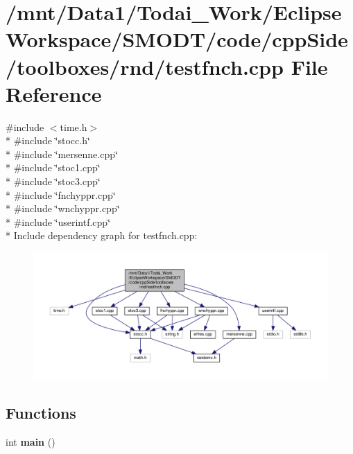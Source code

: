 \section{/mnt/\-Data1/\-Todai\-\_\-\-Work/\-Eclipse\-Workspace/\-S\-M\-O\-D\-T/code/cpp\-Side/toolboxes/rnd/testfnch.cpp File Reference}
\label{toolboxes_2rnd_2testfnch_8cpp}
{\ttfamily \#include $<$time.\-h$>$}\\*
{\ttfamily \#include \char`\"{}stocc.\-h\char`\"{}}\\*
{\ttfamily \#include \char`\"{}mersenne.\-cpp\char`\"{}}\\*
{\ttfamily \#include \char`\"{}stoc1.\-cpp\char`\"{}}\\*
{\ttfamily \#include \char`\"{}stoc3.\-cpp\char`\"{}}\\*
{\ttfamily \#include \char`\"{}fnchyppr.\-cpp\char`\"{}}\\*
{\ttfamily \#include \char`\"{}wnchyppr.\-cpp\char`\"{}}\\*
{\ttfamily \#include \char`\"{}userintf.\-cpp\char`\"{}}\\*
Include dependency graph for testfnch.\-cpp\-:
\nopagebreak
\begin{figure}[H]
\begin{center}
\leavevmode
\includegraphics[width=350pt]{toolboxes_2rnd_2testfnch_8cpp__incl}
\end{center}
\end{figure}
\subsection*{Functions}
\begin{DoxyCompactItemize}
\item 
int {\bf main} ()
\end{DoxyCompactItemize}


